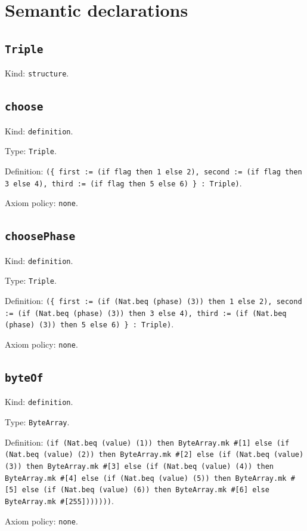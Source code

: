 \documentclass[11pt]{article}
\begin{document}
\section*{Semantic declarations}
\subsection*{\texttt{Triple}}
\noindent Kind: \texttt{structure}.\par
\subsection*{\texttt{choose}}
\noindent Kind: \texttt{definition}.\par
\noindent Type: \texttt{Triple}.\par
\noindent Definition: \texttt{(\{ first := (if flag then 1 else 2), second := (if flag then 3 else 4), third := (if flag then 5 else 6) \} : Triple)}.\par
\noindent Axiom policy: \texttt{none}.\par
\subsection*{\texttt{choosePhase}}
\noindent Kind: \texttt{definition}.\par
\noindent Type: \texttt{Triple}.\par
\noindent Definition: \texttt{(\{ first := (if (Nat.beq (phase) (3)) then 1 else 2), second := (if (Nat.beq (phase) (3)) then 3 else 4), third := (if (Nat.beq (phase) (3)) then 5 else 6) \} : Triple)}.\par
\noindent Axiom policy: \texttt{none}.\par
\subsection*{\texttt{byteOf}}
\noindent Kind: \texttt{definition}.\par
\noindent Type: \texttt{ByteArray}.\par
\noindent Definition: \texttt{(if (Nat.beq (value) (1)) then ByteArray.mk \#[1] else (if (Nat.beq (value) (2)) then ByteArray.mk \#[2] else (if (Nat.beq (value) (3)) then ByteArray.mk \#[3] else (if (Nat.beq (value) (4)) then ByteArray.mk \#[4] else (if (Nat.beq (value) (5)) then ByteArray.mk \#[5] else (if (Nat.beq (value) (6)) then ByteArray.mk \#[6] else ByteArray.mk \#[255]))))))}.\par
\noindent Axiom policy: \texttt{none}.\par
\end{document}
